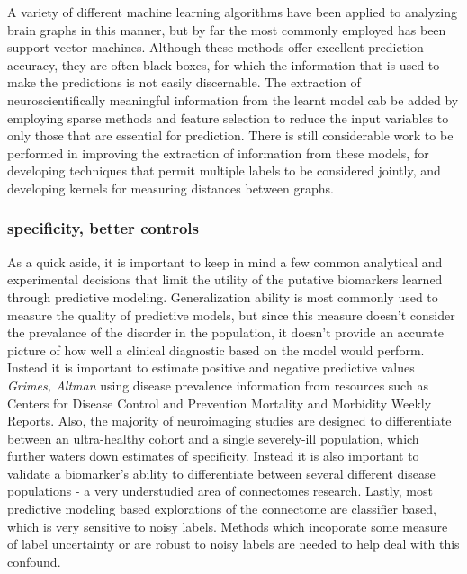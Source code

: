 A variety of different machine learning algorithms have been applied to analyzing brain graphs in this manner,
but by far the most commonly employed has been support vector machines\cite{DiMartino}. Although these methods 
offer excellent prediction accuracy, they are often black boxes, for which the information that is used to make the
predictions is not easily discernable. The extraction of neuroscientifically
meaningful information from the learnt model cab be added by employing sparse methods and feature
selection to reduce the input variables to only those that are
essential for prediction.  There is still considerable work to be performed in
improving the extraction of information from these models, for developing
techniques that permit multiple labels to be considered jointly, and developing
kernels for measuring distances between graphs.

\subsubsection{specificity, better controls}

As a quick aside, it is important to keep in mind a few common analytical and experimental decisions that 
limit the utility of the putative biomarkers learned through predictive modeling. Generalization ability is
most commonly used to measure the quality of predictive models, but since this measure doesn't consider the
prevalance of the disorder in the population, it doesn't provide an accurate picture of how well a clinical 
diagnostic based on the model would perform. Instead it is important to estimate positive and negative predictive 
values \emph{Grimes, Altman} using disease prevalence information from resources such as Centers for Disease Control and 
Prevention Mortality and Morbidity Weekly Reports. Also, the majority of neuroimaging studies are designed to 
differentiate between an ultra-healthy cohort and a single severely-ill population, which further waters down
estimates of specificity. Instead it is also important to validate a biomarker's ability to differentiate between
several different disease populations - a very understudied area of connectomes research. Lastly, most predictive
modeling based explorations of the connectome are classifier based, which is very sensitive to noisy labels. Methods 
which incoporate some measure of label uncertainty or are robust to noisy labels are needed to help deal with this confound.


